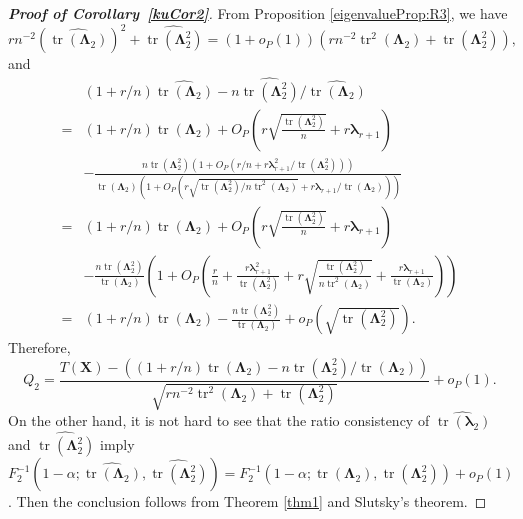 \documentclass[10pt]{book}
\theoremstyle{definition}
\DeclareMathOperator{\mytr}{tr}
\newcommand{\bX}{\mathbf{X}}
\newcommand{\bfsym}[1]{\ensuremath{\boldsymbol{#1}}}
\def\blambda {\bfsym {\lambda}}
\def\bLambda {\bfsym {\Lambda}}
\begin{document}
\begin{proof}[\textbf{Proof of Corollary~\ref{kuCor2}}]
    From Proposition \ref{eigenvalueProp:R3},
    we have
    $$
rn^{-2} (\widehat{\mytr ( \bLambda_2 )})^2 +\widehat{\mytr(\bLambda_2^2)}
=
(1+o_P(1))(rn^{-2} \mytr^2 ( \bLambda_2 ) + \mytr(\bLambda_2^2)),
    $$
    and
    \begin{equation*}
        \begin{split}
    &(1+r/n)\widehat{\mytr(\bLambda_2)}-n\widehat{\mytr(\bLambda_2^2)}/\widehat{\mytr(\bLambda_2)}
    \\
    =&(1+r/n)\mytr(\bLambda_2)
    +O_P\left(r\sqrt{\frac{\mytr(\bLambda_2^2)}{n}}+r\blambda_{r+1}\right)
    \\
    &-\frac{n\mytr(\bLambda_2^2)\left(1+O_P\left(r/n +{r\blambda_{r+1}^2}/{\mytr(\bLambda_2^2)}\right)\right)}
    {\mytr(\bLambda_2)\left(1+O_P\left(r\sqrt{\mytr(\bLambda_2^2)/n\mytr^2(\bLambda_2)}+r\blambda_{r+1}/\mytr(\bLambda_2)\right)\right)}
    \\
    =&(1+r/n)\mytr(\bLambda_2)
    +O_P\left(r\sqrt{\frac{\mytr(\bLambda_2^2)}{n}}+r\blambda_{r+1}\right)
    \\
    &-\frac{n\mytr(\bLambda_2^2)}{\mytr(\bLambda_2)}
\left(1+O_P\left(\frac r n +\frac{r\blambda_{r+1}^2}{\mytr(\bLambda_2^2)}
+r\sqrt{\frac{\mytr(\bLambda_2^2)}{n\mytr^2(\bLambda_2)}}+\frac{r\blambda_{r+1}}{\mytr(\bLambda_2)}\right)\right)
\\
    =&(1+r/n)\mytr(\bLambda_2)-\frac{n\mytr(\bLambda_2^2)}{\mytr(\bLambda_2)}
    +o_P\left(\sqrt{\mytr(\bLambda_2^2)}\right).
        \end{split}
    \end{equation*}
Therefore,
    \begin{equation*}
        Q_2=
\frac{
    T(\bX)
    -
    \left((1+r/n)\mytr(\bLambda_2)-n\mytr(\bLambda_2^2)/\mytr(\bLambda_2)\right)
}{
    \sqrt{
        rn^{-2}\mytr^2(\bLambda_2)+ 
        \mytr(\bLambda_2^2)
    }
}
+o_P(1).
    \end{equation*}
    On the other hand,
    it is not hard to see that the ratio consistency of $\widehat{\mytr(\blambda_2)}$ and $\widehat{\mytr(\bLambda_2^2)}$ imply
     $F_2^{-1}(1-\alpha;\widehat{\mytr(\bLambda_2)},\widehat{\mytr(\bLambda_2^2)})=F_2^{-1}(1-\alpha;\mytr(\bLambda_2),\mytr(\bLambda_2^2))+o_P(1)$.
     Then the conclusion follows from Theorem \ref{thm1} and Slutsky's theorem.
\end{proof}
\end{document}
